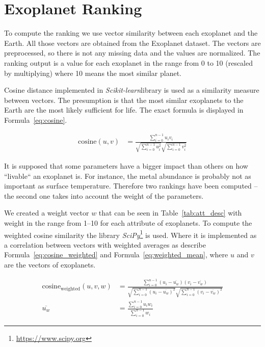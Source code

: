\documentclass[12p]{article}
\begin{document}

\section{Exoplanet Ranking}
To compute the ranking we use vector similarity between each exoplanet and the Earth. All those vectors are obtained from the Exoplanet dataset. The vectors are preprocessed, so there is not any missing data and the values are normalized. The ranking output is a value for each exoplanet in the range from 0 to 10 (rescaled by multiplying) where 10 means the most similar planet.

Cosine distance implemented in \textit{Scikit-learn}\footnotemark[\value{footnote}] library is used as a similarity measure between vectors. The presumption is that the most similar exoplanets to the Earth are the most likely sufficient for life. The exact formula is displayed in Formula~\ref{eq:cosine}.

\begin{align}
    \text{cosine}(u,v) &= \frac{\sum_{i=0}^{n-1} u_iv_i  }{ \sqrt{\sum_{i=0}^{n-1} u_i^2  } \sqrt{\sum_{i=0}^{n-1} v_i^2  }} \label{eq:cosine}
\end{align}

It is supposed that some parameters have a bigger impact than others on how ``livable`` an exoplanet is. For instance, the metal abundance is probably not as important as surface temperature. Therefore two rankings have been computed -- the second one takes into account the weight of the parameters.

We created a weight vector $w$ that can be seen in Table~\ref{tab:att_desc} with weight in the range from 1--10 for each attribute of exoplanets. To compute the weighted cosine similarity the library \textit{SciPy}\footnote{\url{https://www.scipy.org}} is used. Where it is implemented as a correlation between vectors with weighted averages as describe Formula~\ref{eq:cosine_weighted} and Formula~\ref{eq:weighted_mean}, where $u$ and $v$ are the vectors of exoplanets.

\begin{align}
\text{cosine}_{\text{weighted}}(u,v,w) &= \frac{\sum_{i=0}^{n-1} (u_i-\overline{u_w})(v_i-\overline{v_w})  }{ \sqrt{\sum_{i=0}^{n-1} (u_i-\overline{u_w})^2  } \sqrt{\sum_{i=0}^{n-1} (v_i-\overline{v_w})^2  }} \label{eq:cosine_weighted} \\
\overline{u_w} &= \frac{ \sum_{i=0}^{n-1} u_iw_i }{ \sum_{i=0}^{n-1} w_i } \label{eq:weighted_mean}
\end{align}
\end{document}
